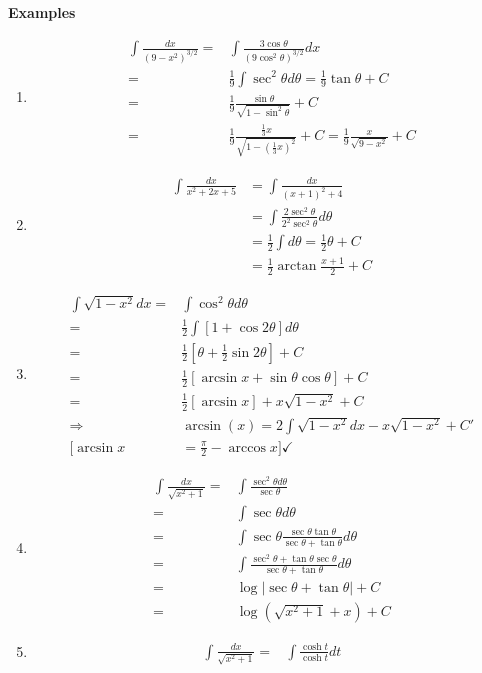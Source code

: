 \documentclass[12pt]{article}
\theoremstyle{plain}
\newcommand{\abs}[1]{\left| #1 \right|}
\begin{document}
{\color{Brown}
\textbf{Examples}
\begin{enumerate}
	\item 
		\begin{align*}
			\int \frac{dx}{(9-x^2)^{3/2}}
			=&\int \frac{3\cos \theta}{(9\cos^2\theta)^{3/2}}dx\\
			=&\frac 19 \int \sec^2\theta d\theta 
			= \frac 19 \tan \theta + C \\
			=& \frac 19 \frac{\sin\theta}{\sqrt{1-\sin^2\theta}}+C\\
			=& \frac 19 \frac{\frac13 x}{\sqrt{1-(\frac13x)^2}}+C
			= \frac 19 \frac x{\sqrt{9-x^2}}+C
		\end{align*}
	\item 
		\begin{align*}
			\int \frac{dx}{x^2+2x+5} 
			&= \int \frac{dx}{(x+1)^2+4} 
			\tag{$x+1=2\tan\theta, dx=2\sec^2\theta d\theta$}\\
			&= \int \frac{2\sec^2\theta}{2^2\sec^2\theta}d\theta\\
			&= \frac12 \int d\theta = \frac12 \theta+C\\
			&= \frac12 \arctan \frac{x+1}2 + C
		\end{align*}

	\item 
		\begin{align*}
			\int \sqrt{1-x^2}dx
			=& \int \cos^2\theta d\theta\\
			=& \frac 12 \int [1+\cos 2\theta]d\theta\\
			=& \frac12[\theta + \frac12 \sin 2\theta] + C\\
			=& \frac12[\arcsin x + \sin \theta \cos \theta] + C\\
			=& \frac 12[\arcsin x]+ x\sqrt{1-x^2} + C\\
			\Rightarrow &\arcsin (x) = 2\int\sqrt{1-x^2}dx -x\sqrt{1-x^2}
			+ C'\\
			[\arcsin x &= \frac{\pi}2 -\arccos x] \checkmark
		\end{align*}

	\item 
		\begin{align*}
			\int \frac{dx}{\sqrt{x^2+1}}\tag{$x = \tan \theta, 
			dx = \sec^2 \theta d\theta$}
			=& \int \frac{\sec^2 \theta d\theta}{\sec \theta}\\
			=& \int \sec \theta d\theta\\
			=& \int \sec\theta \frac{\sec \theta \tan \theta}
			{\sec\theta + \tan \theta} d\theta\\
			=& \int \frac{\sec^2\theta +\tan \theta \sec \theta}
			{\sec \theta + \tan \theta} d\theta\\
			=& \log \abs{\sec\theta + \tan \theta} + C\\
			=& \log (\sqrt{x^2+1}+x)+C
		\end{align*}

	\item 
		\begin{align*}
			\int \frac{dx}{\sqrt{x^2+1}}\tag{$x = \tan \theta, $}
			=& \int \frac{\cosh t}{\cosh t} dt
		\end{align*}
\end{enumerate}

}
\end{document}
